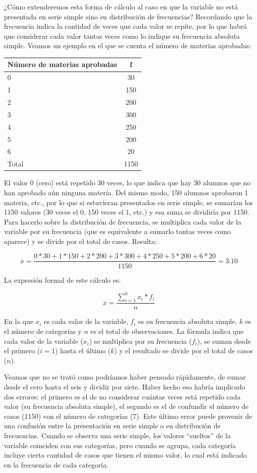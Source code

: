 \documentclass[]{book}
\begin{document}
¿Cómo extenderemos esta forma de cálculo al caso en que la variable no
está presentada en serie simple sino en distribución de frecuencias?
Recordando que la frecuencia indica la cantidad de veces que cada valor
se repite, por lo que habrá que considerar cada valor tantas veces como
lo indique su frecuencia absoluta simple. Veamos un ejemplo en el que se
cuenta el número de materias aprobadas:

\begin{longtable}[]{@{}lc@{}}
\toprule
Número de materias aprobadas & f\tabularnewline
\midrule
\endhead
0 & 30\tabularnewline
1 & 150\tabularnewline
2 & 200\tabularnewline
3 & 300\tabularnewline
4 & 250\tabularnewline
5 & 200\tabularnewline
6 & 20\tabularnewline
Total & 1150\tabularnewline
\bottomrule
\end{longtable}

El valor 0 (cero) está repetido 30 veces, lo que indica que hay 30
alumnos que no han aprobado aún ninguna materia. Del mismo modo, 150
alumnos aprobaron 1 materia, etc., por lo que si estuvieran presentados
en serie simple, se sumarían los 1150 valores (30 veces el 0, 150 veces
el 1, etc.) y esa suma se dividiría por 1150. Para hacerlo sobre la
distribución de frecuencia, se multiplica cada valor de la variable por
su frecuencia (que es equivalente a sumarlo tantas veces como aparece) y
se divide por el total de casos. Resulta:

\[\overline{x} = \frac{0*30 + 1*150 + 2*200 + 3*300 + 4*250 + 5*200 + 6*20}{1150} = 3.10\]

La expresión formal de este cálculo es:

\[\overline{x} = \frac{\sum_{i = 1}^{k}{x_{i}*f_{i}}}{n}\]

En la que \(x_i\) es cada valor de la variable, \(f_i\) es su frecuencia
absoluta simple, \(k\) es el número de categorías y \(n\) es el total de
observaciones. La fórmula indica que cada valor de la variable (\(x_i\))
se multiplica por su frecuencia (\(f_i\)), se suman desde el primero
(\(i=1\)) hasta el último (\(k\)) y el resultado se divide por el total de
casos (\(n\)).

Veamos que no se trató como podríamos haber pensado rápidamente, de
sumar desde el cero hasta el seis y dividir por siete. Haber hecho eso
habría implicado dos errores: el primero es el de no considerar cuántas
veces está repetido cada valor (su frecuencia absoluta simple), el
segundo es el de confundir el número de casos (1150) con el número de
categorías (7). Este último error puede provenir de una confusión entre
la presentación en serie simple o en distribución de frecuencias. Cuando
se observa una serie simple, los valores ``sueltos'' de la variable
coinciden con sus categorías, pero cuando se agrupa, cada categoría
incluye cierta cantidad de casos que tienen el mismo valor, lo cual está
indicado en la frecuencia de cada categoría.
\end{document}
